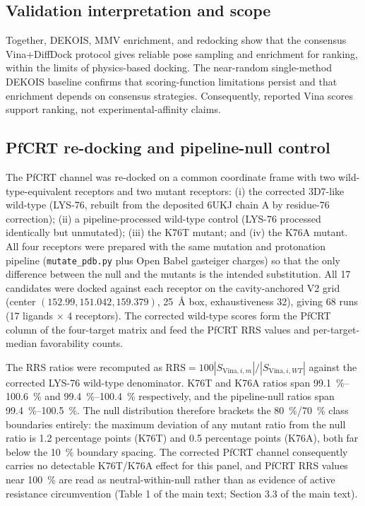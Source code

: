 \documentclass[11pt,a4paper]{article}
\begin{document}
	\subsection{Validation interpretation and scope}\label{sec:sm_val_scope}
	Together, DEKOIS, MMV enrichment, and redocking show that the consensus Vina+DiffDock protocol gives reliable pose sampling and enrichment for ranking, within the limits of physics-based docking. The near-random single-method DEKOIS baseline confirms that scoring-function limitations persist and that enrichment depends on consensus strategies. Consequently, reported Vina scores support ranking, not experimental-affinity claims.
	
	\subsection{PfCRT re-docking and pipeline-null control}\label{sec:sm_val_redock_null}
	The PfCRT channel was re-docked on a common coordinate frame with two wild-type-equivalent receptors and two mutant receptors: (i) the corrected 3D7-like wild-type (LYS-76, rebuilt from the deposited 6UKJ chain A by residue-76 correction); (ii) a pipeline-processed wild-type control (LYS-76 processed identically but unmutated); (iii) the K76T mutant; and (iv) the K76A mutant. All four receptors were prepared with the same mutation and protonation pipeline (\texttt{mutate\_pdb.py} plus Open Babel gasteiger charges) so that the only difference between the null and the mutants is the intended substitution. All \num{17} candidates were docked against each receptor on the cavity-anchored V2 grid (center $(\num{152.99}, \num{151.042}, \num{159.379})$, \qty{25}{\angstrom} box, exhaustiveness \num{32}), giving \num{68} runs (\num{17} ligands $\times$ \num{4} receptors). The corrected wild-type scores form the PfCRT column of the four-target matrix and feed the PfCRT RRS values and per-target-median favorability counts.
	
	The RRS ratios were recomputed as $\mathrm{RRS}=100|S_{\mathrm{Vina},i,m}|/|S_{\mathrm{Vina},i,WT}|$ against the corrected LYS-76 wild-type denominator. K76T and K76A ratios span \qtyrange{99.1}{100.6}{\percent} and \qtyrange{99.4}{100.4}{\percent} respectively, and the pipeline-null ratios span \qtyrange{99.4}{100.5}{\percent}. The null distribution therefore brackets the \qty{80}{\percent}/\qty{70}{\percent} class boundaries entirely: the maximum deviation of any mutant ratio from the null ratio is \num{1.2} percentage points (K76T) and \num{0.5} percentage points (K76A), both far below the \qty{10}{\percent} boundary spacing. The corrected PfCRT channel consequently carries no detectable K76T/K76A effect for this panel, and PfCRT RRS values near \qty{100}{\percent} are read as neutral-within-null rather than as evidence of active resistance circumvention (Table 1 of the main text; Section 3.3 of the main text).
	
\end{document}
